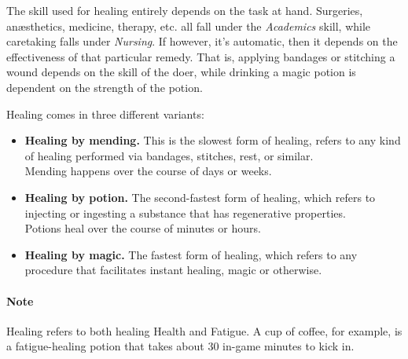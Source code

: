 The skill used for healing entirely depends on the task at hand.
Surgeries, anæsthetics, medicine, therapy, etc. all fall under the \textit{Academics} skill, while caretaking falls under \textit{Nursing}.
If however, it's automatic, then it depends on the effectiveness of that particular remedy.
That is, applying bandages or stitching a wound depends on the skill of the doer, while drinking a magic potion is dependent on the strength of the potion.

Healing comes in three different variants:

\begin{center}
  \begin{itemize}
  \item \textbf{Healing by mending.}
    This is the slowest form of healing, refers to any kind of healing performed via bandages, stitches, rest, or similar.\\
    Mending happens over the course of days or weeks.
  \item \textbf{Healing by potion.}
    The second-fastest form of healing, which refers to injecting or ingesting a substance that has regenerative properties. \\
    Potions heal over the course of minutes or hours.
  \item \textbf{Healing by magic.}
    The fastest form of healing, which refers to any procedure that facilitates instant healing, magic or otherwise.
  \end{itemize}
\end{center}

\paragraph{Note} Healing refers to both healing Health and Fatigue.
A cup of coffee, for example, is a fatigue-healing potion that takes about 30 in-game minutes to kick in.
